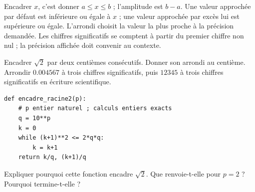 \begin{keypoint}[Vocabulaire]
Encadrer $x$, c'est donner $a\leq x\leq b$ ; l'amplitude est $b-a$. Une valeur approchée par défaut est inférieure ou égale à $x$ ; une valeur approchée par excès lui est supérieure ou égale. L'arrondi choisit la valeur la plus proche à la précision demandée.
Les chiffres significatifs se comptent à partir du premier chiffre non nul ; la précision affichée doit convenir au contexte.
\end{keypoint}
\begin{example}Encadrer $\sqrt2$ par deux centièmes consécutifs. Donner son arrondi au centième. Arrondir $\num{0,004567}$ à trois chiffres significatifs, puis $12345$ à trois chiffres significatifs en écriture scientifique.\end{example}
\begin{lstlisting}
def encadre_racine2(p):
    # p entier naturel ; calculs entiers exacts
    q = 10**p
    k = 0
    while (k+1)**2 <= 2*q*q:
        k = k+1
    return k/q, (k+1)/q
\end{lstlisting}
\begin{example}Expliquer pourquoi cette fonction encadre $\sqrt2$. Que renvoie-t-elle pour $p=2$ ? Pourquoi termine-t-elle ?\end{example}
